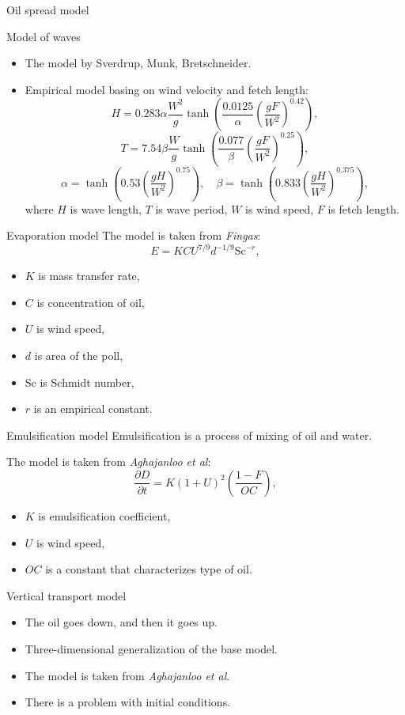 \documentclass{beamer}
\begin{document}
\begin{section}{Oil spread model}
\begin{frame}{Model of waves}
\begin{itemize}
	\item The model by Sverdrup, Munk, Bretschneider.
	\item Empirical model basing on wind velocity and fetch length:
	$$H = 0.283\alpha \frac{W^2}{g}\tanh\left(\frac{0.0125}{\alpha}\left(\frac{gF}{W^2}\right)^{0.42}\right),$$
	$$T = 7.54\beta\frac{W}{g}\tanh\left(\frac{0.077}{\beta}\left(\frac{gF}{W^2}\right)^{0.25}\right),$$
	$$\alpha = \tanh\left(0.53 \left(\frac{gH}{W^2}\right)^{0.75}\right),\quad \beta = \tanh\left(0.833\left(\frac{gH}{W^2}\right)^{0.375}\right),$$
	where $H$ is wave length, $T$ is wave period, $W$ is wind speed, $F$ is fetch length.
\end{itemize}
\end{frame}

\begin{frame}{Evaporation model}
The model is taken from \textit{Fingas}:
$$E = KCU^{7/9}d^{-1/9}\textrm{Sc}^{-r},$$
\begin{itemize}
	\item $K$ is mass transfer rate,
	\item $C$ is concentration of oil,
	\item $U$ is wind speed,
	\item $d$ is area of the poll,
	\item Sc is Schmidt number,
	\item $r$ is an empirical constant. 
\end{itemize}
\end{frame}

\begin{frame}{Emulsification model}
Emulsification is a process of mixing of oil and water.

The model is taken from \textit{Aghajanloo et al}:
$$\frac{\partial D}{\partial t} = K \left(1 + U\right)^2\left(\frac{1 - F}{OC}\right),$$
\begin{itemize}
	\item $K$ is emulsification coefficient, 
	\item $U$ is wind speed,
	\item $OC$ is a constant that characterizes type of oil.
\end{itemize}
\end{frame}

\begin{frame}{Vertical transport model}
\begin{itemize}
	\item The oil goes down, and then it goes up.
	\item Three-dimensional generalization of the base model.
	\item The model is taken from \textit{Aghajanloo et al}.
	\item There is a problem with initial conditions.
\end{itemize}


\end{frame}
\end{section}
\end{document}
